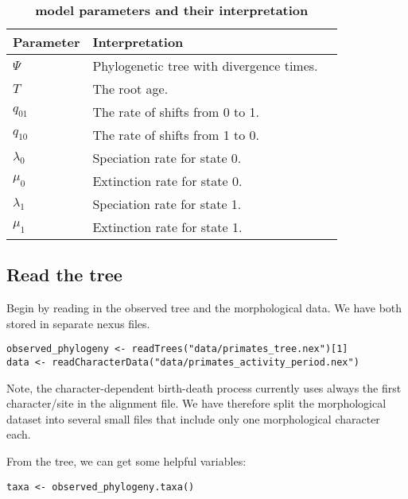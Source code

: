 \begin{table}[t!]
	\centering
	\caption{\bf{\HiSSE model parameters and their interpretation}} \label{tab:Hparam}
	\begin{tabular}{ l l l }
		\toprule
		Parameter & Interpretation \\
		\midrule
		$\Psi$ & Phylogenetic tree with divergence times.\\
		\rowcolor{gray!15} $T$ & The root age.\\
		$q_{01}$ & The rate of shifts from 0 to 1.\\
		\rowcolor{gray!15} $q_{10}$ & The rate of shifts from 1 to 0.\\
		$\lambda_0$ & Speciation rate for state 0.\\
		\rowcolor{gray!15} $\mu_0$ & Extinction rate for state 0.\\
		$\lambda_1$ & Speciation rate for state 1.\\
		\rowcolor{gray!15} $\mu_1$ & Extinction rate for state 1.\\
	\end{tabular}
\end{table}


\subsection{Read the tree}

Begin by reading in the observed tree and the morphological data. 
We have both stored in separate nexus files.
{\tt \begin{snugshade*}
\begin{lstlisting}
observed_phylogeny <- readTrees("data/primates_tree.nex")[1]
data <- readCharacterData("data/primates_activity_period.nex")
\end{lstlisting}
\end{snugshade*}}
Note, the character-dependent birth-death process currently uses always the first character/site in the alignment file.
We have therefore split the morphological dataset into several small files that include only one morphological character each.

From the tree, we can get some helpful variables:
{\tt \begin{snugshade*}
\begin{lstlisting}
taxa <- observed_phylogeny.taxa()
\end{lstlisting}
\end{snugshade*}}

